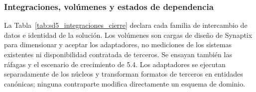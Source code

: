\subsubsection{Integraciones, volúmenes y estados de dependencia}
\label{subsec:sd5_integraciones_cierre}

La Tabla~\ref{tab:sd5_integraciones_cierre} declara cada familia de intercambio de datos e identidad de la solución. Los volúmenes son cargas de diseño de Synaptix para dimensionar y aceptar los adaptadores, no mediciones de los sistemas existentes ni disponibilidad contratada de terceros. Se ensayan también las ráfagas y el escenario de crecimiento de 5.4. Los adaptadores se ejecutan separadamente de los núcleos y transforman formatos de terceros en entidades canónicas; ninguna contraparte modifica directamente un esquema de dominio.

